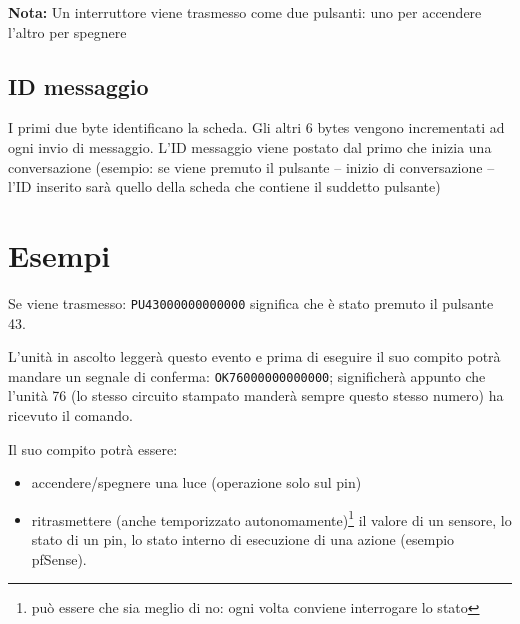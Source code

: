 \documentclass[italian]{article}
\begin{document}
    
    \textbf{Nota:} Un interruttore viene trasmesso come due pulsanti: uno per accendere l'altro per spegnere
    
    \subsection*{ID messaggio}
    
    I primi due byte identificano la scheda. Gli altri 6 bytes vengono incrementati ad ogni invio di messaggio. L'ID messaggio viene postato dal primo che inizia una conversazione (esempio: se viene premuto il pulsante -- inizio di conversazione -- l'ID inserito sarà quello della scheda che contiene il suddetto pulsante)
    
    \section*{Esempi}
    
    Se viene trasmesso: \texttt{PU43000000000000} significa che è stato premuto il pulsante 43.
    
    L'unità in ascolto leggerà questo evento e prima di eseguire il suo compito  potrà mandare un segnale di conferma: \texttt{OK76000000000000}; significherà appunto che l'unità 76 (lo stesso circuito stampato manderà sempre questo stesso numero) ha ricevuto il comando.
    
    Il suo compito potrà essere:
    
    \begin{itemize}
        \item accendere/spegnere una luce (operazione solo sul pin)
        \item ritrasmettere (anche temporizzato autonomamente)\footnote{può essere che sia meglio di no: ogni volta conviene interrogare lo stato} il valore di un sensore, lo stato di un pin, lo stato interno di esecuzione di una azione (esempio pfSense).
    \end{itemize}
    
\end{document}
